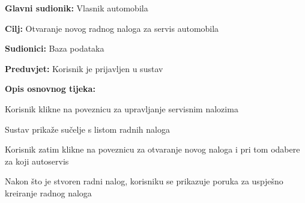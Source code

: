 					\begin{packed_item}
						
						\item \textbf{Glavni sudionik: } Vlasnik automobila
						\item  \textbf{Cilj:} Otvaranje novog radnog naloga za servis automobila
						\item  \textbf{Sudionici:} Baza podataka
						\item  \textbf{Preduvjet:} Korisnik je prijavljen u sustav
						\item  \textbf{Opis osnovnog tijeka:}
						
						\item[] \begin{packed_enum}
							
							\item Korisnik klikne na poveznicu za upravljanje servisnim nalozima
							\item Sustav prikaže sučelje s listom radnih naloga
							\item Korisnik zatim klikne na poveznicu za otvaranje novog naloga i pri tom odabere za koji autoservis
							\item Nakon što je stvoren radni nalog, korisniku se prikazuje poruka za uspješno kreiranje radnog naloga
							
						\end{packed_enum}
					\end{packed_item}
					
